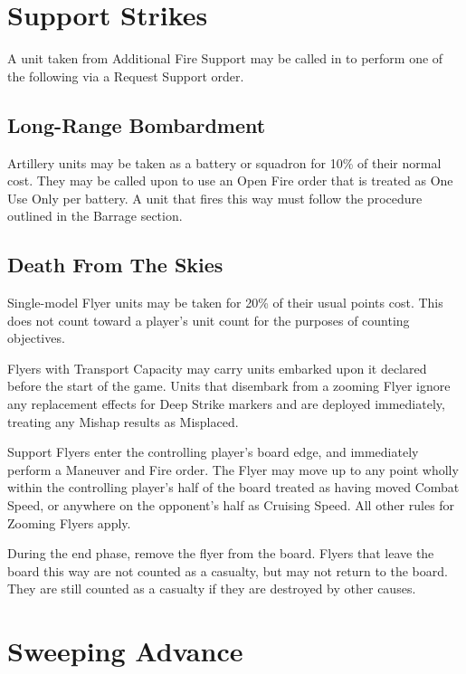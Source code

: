 \documentclass[letterpaper,twocolumn,oneside,titlepage]{book}
\begin{document}
\section{\texorpdfstring{\textbf{Support
Strikes}}{Support Strikes}}\label{support-strikes}

A unit taken from Additional Fire Support may be called in to perform
one of the following via a Request Support order.

\subsection{\texorpdfstring{\textbf{Long-Range
Bombardment}}{Long-Range Bombardment}}\label{long-range-bombardment}

Artillery units may be taken as a battery or squadron for 10\% of their
normal cost. They may be called upon to use an Open Fire order that is
treated as One Use Only per battery. A unit that fires this way must
follow the procedure outlined in the Barrage section.

\subsection{\texorpdfstring{\textbf{Death From The
Skies}}{Death From The Skies}}\label{death-from-the-skies}

Single-model Flyer units may be taken for 20\% of their usual points
cost. This does not count toward a player's unit count for the purposes
of counting objectives.

Flyers with Transport Capacity may carry units embarked upon it declared
before the start of the game. Units that disembark from a zooming Flyer
ignore any replacement effects for Deep Strike markers and are deployed
immediately, treating any Mishap results as Misplaced.

Support Flyers enter the controlling player's board edge, and
immediately perform a Maneuver and Fire order. The Flyer may move up to
any point wholly within the controlling player's half of the board
treated as having moved Combat Speed, or anywhere on the opponent's half
as Cruising Speed. All other rules for Zooming Flyers apply.

During the end phase, remove the flyer from the board. Flyers that leave
the board this way are not counted as a casualty, but may not return to
the board. They are still counted as a casualty if they are destroyed by
other causes.

\section{\texorpdfstring{\textbf{Sweeping
Advance}}{Sweeping Advance}}\label{sweeping-advance}
\end{document}
